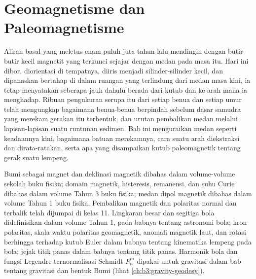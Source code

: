 \chapter{Geomagnetisme dan Paleomagnetisme}\label{ch:b3:palaeomagnetism}

Aliran basal yang meletus enam puluh juta tahun lalu mendingin dengan butir-butir kecil
magnetit yang terkunci sejajar dengan medan pada masa itu. Hari ini dibor, diorientasi
di tempatnya, diiris menjadi silinder-silinder kecil, dan dipanaskan
bertahap di dalam ruangan yang terlindung dari medan masa kini, ia tetap menyatakan seberapa jauh
dahulu berada dari kutub dan ke arah mana ia menghadap. Ribuan pengukuran serupa itu
dari setiap benua dan setiap umur telah mengungkap bagaimana benua-benua berpindah
sebelum dasar samudra yang merekam gerakan itu terbentuk, dan urutan
pembalikan medan melalui lapisan-lapisan suatu runtunan
sedimen. Bab ini menguraikan medan seperti keadaannya kini, bagaimana batuan merekamnya,
cara suatu arah diekstraksi dan dirata-ratakan, serta apa yang disampaikan kutub paleomagnetik
tentang gerak suatu lempeng.

\begin{recall}
Bumi sebagai magnet dan deklinasi magnetik dibahas dalam volume-volume sekolah
buku fisika; domain magnetik, histeresis, remanensi, dan suhu Curie dibahas dalam
volume Tahun 3 buku fisika; medan dipol magnetik dibahas dalam
volume Tahun 1 buku fisika. Pembalikan magnetik dan polaritas normal dan terbalik
telah dijumpai di kelas 11. Lingkaran besar dan segitiga bola didefinisikan dalam
volume Tahun 1, pada babnya tentang astronomi bola; kron polaritas, skala waktu
polaritas geomagnetik, anomali magnetik laut, dan rotasi berhingga
terhadap kutub Euler dalam babnya tentang kinematika lempeng pada bola;
jejak titik panas dalam babnya tentang titik panas. Harmonik bola dan
fungsi Legendre ternormalisasi Schmidt $P_n^m$ dipakai untuk gravitasi dalam
bab tentang gravitasi dan bentuk Bumi (lihat \cref{ch:b3:gravity-geodesy}).
\end{recall}

